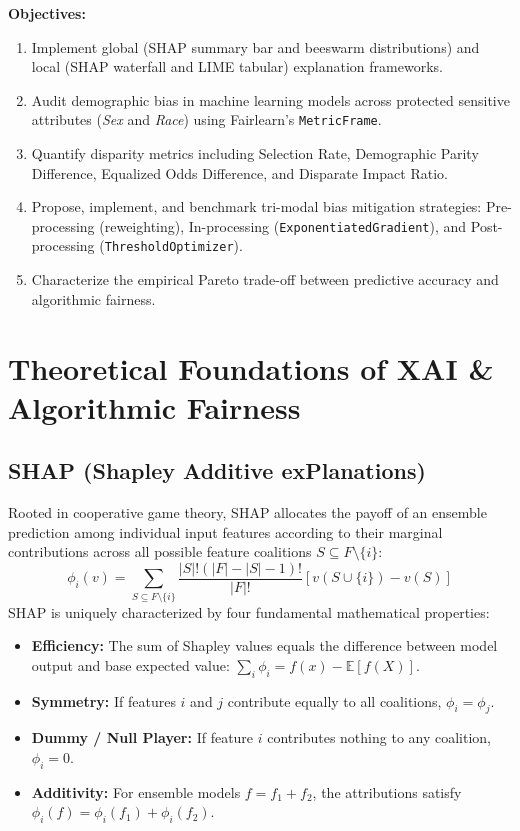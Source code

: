 \documentclass[11pt, a4paper]{article}
\begin{document}
\noindent \textbf{Objectives:}
\begin{enumerate}[leftmargin=2em]
    \item Implement global (SHAP summary bar and beeswarm distributions) and local (SHAP waterfall and LIME tabular) explanation frameworks.
    \item Audit demographic bias in machine learning models across protected sensitive attributes (\textit{Sex} and \textit{Race}) using Fairlearn's \texttt{MetricFrame}.
    \item Quantify disparity metrics including Selection Rate, Demographic Parity Difference, Equalized Odds Difference, and Disparate Impact Ratio.
    \item Propose, implement, and benchmark tri-modal bias mitigation strategies: Pre-processing (reweighting), In-processing (\texttt{ExponentiatedGradient}), and Post-processing (\texttt{ThresholdOptimizer}).
    \item Characterize the empirical Pareto trade-off between predictive accuracy and algorithmic fairness.
\end{enumerate}

\section{Theoretical Foundations of XAI \& Algorithmic Fairness}

\subsection{SHAP (Shapley Additive exPlanations)}
Rooted in cooperative game theory, SHAP allocates the payoff of an ensemble prediction among individual input features according to their marginal contributions across all possible feature coalitions $S \subseteq F \setminus \{i\}$:
\begin{equation}
\phi_i(v) = \sum_{S \subseteq F \setminus \{i\}} \frac{|S|!(|F| - |S| - 1)!}{|F|!} \left[ v(S \cup \{i\}) - v(S) \right]
\end{equation}
SHAP is uniquely characterized by four fundamental mathematical properties:
\begin{itemize}[leftmargin=1.5em]
    \item \textbf{Efficiency:} The sum of Shapley values equals the difference between model output and base expected value: $\sum_{i} \phi_i = f(x) - \mathbb{E}[f(X)]$.
    \item \textbf{Symmetry:} If features $i$ and $j$ contribute equally to all coalitions, $\phi_i = \phi_j$.
    \item \textbf{Dummy / Null Player:} If feature $i$ contributes nothing to any coalition, $\phi_i = 0$.
    \item \textbf{Additivity:} For ensemble models $f = f_1 + f_2$, the attributions satisfy $\phi_i(f) = \phi_i(f_1) + \phi_i(f_2)$.
\end{itemize}
\end{document}
